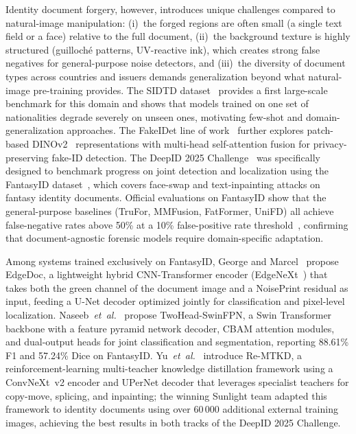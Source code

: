 Identity document forgery, however, introduces unique challenges compared to
natural-image manipulation: (i)~the forged regions are often small (a single
text field or a face) relative to the full document, (ii)~the background texture
is highly structured (guilloché patterns, UV-reactive ink), which creates strong
false negatives for general-purpose noise detectors, and (iii)~the diversity of
document types across countries and issuers demands generalization beyond what
natural-image pre-training provides.
The SIDTD dataset~\cite{sidtd2024} provides a first large-scale benchmark for
this domain and shows that models trained on one set of nationalities degrade
severely on unseen ones, motivating few-shot and domain-generalization approaches.
The FakeIDet line of work~\cite{fakeidet2025} further explores patch-based
DINOv2~\cite{dosovitskiy2021vit} representations with multi-head self-attention fusion for
privacy-preserving fake-ID detection. The DeepID 2025 Challenge~\cite{deepid2025challenge}
was specifically designed to benchmark progress on joint detection and localization
using the FantasyID dataset~\cite{fantasyid2024}, which covers face-swap and
text-inpainting attacks on fantasy identity documents. Official evaluations on
FantasyID show that the general-purpose baselines (TruFor, MMFusion, FatFormer,
UniFD) all achieve false-negative rates above 50\% at a 10\% false-positive rate
threshold~\cite{fantasyid2024}, confirming that document-agnostic forensic models
require domain-specific adaptation.

Among systems trained exclusively on FantasyID, George and
Marcel~\cite{edgedoc2025} propose EdgeDoc, a lightweight hybrid
CNN-Transformer encoder (EdgeNeXt~\cite{edgenext2022}) that takes both the
green channel of the document image and a NoisePrint residual as input, feeding
a U-Net decoder optimized jointly for classification and pixel-level
localization. Naseeb~\textit{et~al.}~\cite{twoheadswin2026} propose
TwoHead-SwinFPN, a Swin Transformer backbone with a feature pyramid network
decoder, CBAM attention modules, and dual-output heads for joint classification
and segmentation, reporting 88.61\% F1 and 57.24\% Dice on FantasyID.
Yu~\textit{et~al.}~\cite{remtkd2025} introduce Re-MTKD, a reinforcement-learning
multi-teacher knowledge distillation framework using a ConvNeXt~v2 encoder
and UPerNet decoder that leverages specialist teachers for copy-move, splicing,
and inpainting; the winning Sunlight team adapted this framework to identity
documents using over 60\,000 additional external training images, achieving the
best results in both tracks of the DeepID 2025 Challenge.

